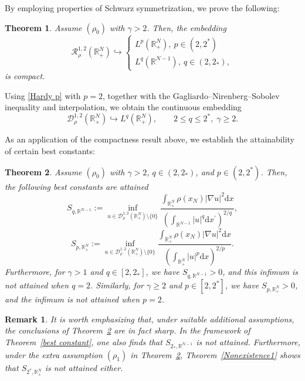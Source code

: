 \documentclass[12pt,reqno]{amsart}
\newtheorem{theorem}{Theorem}[section]
\newtheorem{remark}{Remark}[section]
\begin{document}
By employing properties of Schwarz symmetrization, we prove the following:

\begin{theorem}\label{Compact embedding}
Assume $(\rho_0)$ with $\gamma>2$. Then, the embedding 
\begin{equation*}
		\mathcal{R}^{1,2}_\rho(\mathds{R}^N_+)\hookrightarrow\left\{
		\begin{aligned}
			L^p(\mathds{R}^N_+),~p\in (2,2^\ast)\\
			L^q(\mathds{R}^{N-1}),~q\in (2,2_\ast),
		\end{aligned}
		\right.
	\end{equation*}
is compact.
\end{theorem}

Using \eqref{Hardy p} with $p=2$, together with the Gagliardo--Nirenberg--Sobolev inequality and interpolation, we obtain the continuous embedding
\[
\mathcal{D}^{1,2}_\rho(\mathds{R}^N_+) \hookrightarrow L^q(\mathds{R}^N_+),
\qquad 2 \leq q \leq 2^*, \; \gamma \geq 2.
\]

As an application of the compactness result above, we establish the attainability of certain best constants:

\begin{theorem}\label{Attainability}
Assume $(\rho_0)$ with $\gamma > 2$, $q \in (2, 2_\ast)$, and $p \in (2, 2^\ast)$. Then, the following best constants are attained
\begin{equation}\label{Constant1}
S_{q,\mathds{R}^{N-1}} := \inf_{u \in \mathcal{D}^{1,2}_\rho(\mathds{R}^N_+) \setminus \{0\}} \frac{\int_{\mathds{R}^N_+} \rho(x_N) |\nabla u|^2  \mathrm{d}x}{\left( \int_{\mathds{R}^{N-1}} |u|^{q}  \mathrm{d}x^\prime \right)^{2/q}},
\end{equation}
\begin{equation}\label{Constant2}
S_{p,\mathds{R}^N_+} := \inf_{u \in \mathcal{D}^{1,2}_\rho(\mathds{R}^N_+) \setminus \{0\}} \frac{\int_{\mathds{R}^N_+} \rho(x_N) |\nabla u|^2  \mathrm{d}x}{\left( \int_{\mathds{R}^N_+} |u|^p  \mathrm{d}x \right)^{2/p}}.
\end{equation}
Furthermore, for $\gamma > 1$ and $q \in [2, 2_\ast]$, we have $S_{q,\mathds{R}^{N-1}} > 0$, and this infimum is not attained when $q = 2$. Similarly, for $\gamma \geq 2$ and $p \in [2, 2^\ast]$, we have $S_{p,\mathds{R}^N_+} > 0$, and the infimum is not attained when $p = 2$.
\end{theorem}

\begin{remark} 
It is worth emphasizing that, under suitable additional assumptions, the conclusions of Theorem~\ref{Attainability} are in fact sharp. 
In the framework of Theorem~\ref{best constant}, one also finds that $S_{2_\ast,\mathds{R}^{N-1}}$ is not attained. 
Furthermore, under the extra assumption $(\rho_1)$ in Theorem~\ref{Attainability}, Theorem~\ref{Nonexistence1} shows that $S_{2^\ast,\mathds{R}^N_+}$ is not attained either.    
\end{remark}
\end{document}

